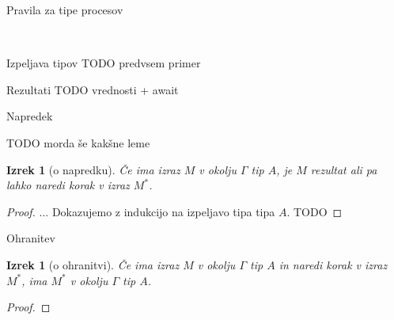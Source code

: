 \documentclass{beamer}
\theoremstyle{definition} %
\theoremstyle{plain} %
\newtheorem{izrek}[definicija]{Izrek}
\begin{document}
	\begin{frame}{Pravila za tipe procesov}
		\begin{figure}[tp]
			\centering
			\small
			\begin{mathpar}
				\quad
				\\
				\quad
			\end{mathpar}
		\end{figure}
	\end{frame}

	\begin{frame}{Izpeljava tipov}
		TODO predvsem primer
	\end{frame}


	\begin{frame}{Rezultati}
		TODO vrednosti + await
	\end{frame}

	
	\begin{frame}{Napredek}
			
		TODO morda še kakšne leme
		
		\begin{izrek}[o napredku]
			Če ima izraz $M$ v okolju $\Gamma$ tip $A$, je $M$ rezultat ali pa lahko naredi korak v izraz $M^*$.
		\end{izrek}
		
		\begin{proof}
			... 
			Dokazujemo z indukcijo na izpeljavo tipa tipa $A$. TODO
		\end{proof}
		
	\end{frame}

	
		
	\begin{frame}{Ohranitev}
				
		\begin{izrek}[o ohranitvi]
			Če ima izraz $M$ v okolju $\Gamma$ tip $A$ in naredi korak v izraz $M^*$, ima $M^*$ v okolju $\Gamma$ tip $A$.
		\end{izrek}
		
		\begin{proof}
		\end{proof}
		
	\end{frame}
\end{document}
